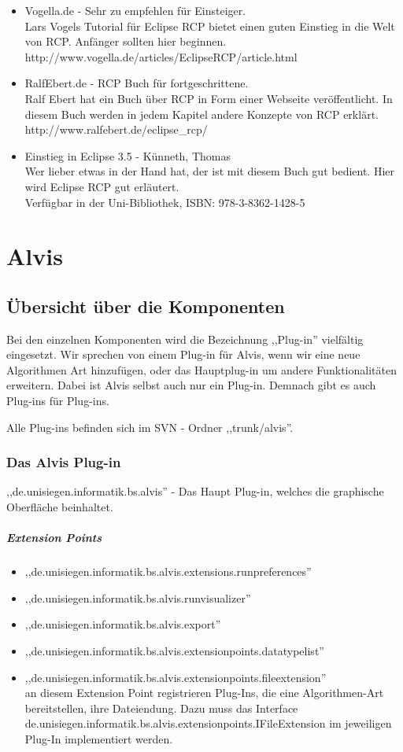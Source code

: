 \documentclass[10pt,a4paper]{article}
\begin{document}
\begin{itemize}
\item Vogella.de - Sehr zu empfehlen für Einsteiger. \\
Lars Vogels Tutorial für Eclipse RCP bietet einen guten Einstieg in die Welt von RCP. Anfänger sollten hier beginnen.\\
http://www.vogella.de/articles/EclipseRCP/article.html
\item RalfEbert.de - RCP Buch für fortgeschrittene. \\
Ralf Ebert hat ein Buch über RCP in Form einer Webseite veröffentlicht. In diesem Buch werden in jedem Kapitel andere Konzepte von RCP erklärt. \\
http://www.ralfebert.de/eclipse\_rcp/
\item Einstieg in Eclipse 3.5 - Künneth, Thomas \\
Wer lieber etwas in der Hand hat, der ist mit diesem Buch gut bedient. Hier wird Eclipse RCP gut erläutert. \\
Verfügbar in der Uni-Bibliothek, ISBN: 978-3-8362-1428-5
\end{itemize}



\newpage
\section{Alvis}
\subsection{Übersicht über die Komponenten}
Bei den einzelnen Komponenten wird die Bezeichnung ,,Plug-in'' vielfältig eingesetzt. Wir sprechen von einem Plug-in für Alvis, wenn wir eine neue Algorithmen Art hinzufügen, oder das Hauptplug-in um andere Funktionalitäten erweitern. Dabei ist Alvis selbst auch nur ein Plug-in. Demnach gibt es auch Plug-ins für Plug-ins.

Alle Plug-ins befinden sich im SVN - Ordner ,,trunk/alvis''.
\subsubsection{Das Alvis Plug-in}
,,de.unisiegen.informatik.bs.alvis'' - Das Haupt Plug-in, welches die graphische Oberfläche beinhaltet.
\subparagraph{Extension Points}
\begin{itemize}
 \item ,,de.unisiegen.informatik.bs.alvis.extensions.runpreferences''
 \item ,,de.unisiegen.informatik.bs.alvis.runvisualizer''
 \item ,,de.unisiegen.informatik.bs.alvis.export''
 \item ,,de.unisiegen.informatik.bs.alvis.extensionpoints.datatypelist''
 \item ,,de.unisiegen.informatik.bs.alvis.extensionpoints.fileextension''\\ an diesem Extension Point registrieren Plug-Ins,
	  die eine Algorithmen-Art bereitstellen, ihre Dateiendung. Dazu muss das Interface\\
	  de.unisiegen.informatik.bs.alvis.extensionpoints.IFileExtension im jeweiligen Plug-In implementiert werden.
\end{itemize}
\end{document}
